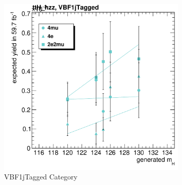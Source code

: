 \begin{figure}[h]
\begin{subfigure}[b]{0.3\textwidth}
         \includegraphics[width=\textwidth]{images/cFits_ttH_hzz_VBF1jTagged_.png}
         \caption{VBF1jTagged Category}
     \end{subfigure}
      \hfill
     \begin{subfigure}[b]{0.3\textwidth}
         

\end{subfigure}
\end{figure}
